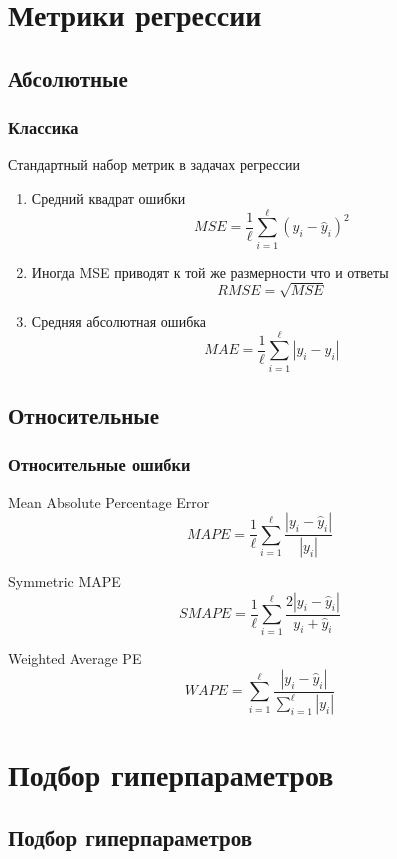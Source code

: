 \documentclass{beamer}
\begin{document}
	\section{Метрики регрессии}
	
	\subsection{Абсолютные}
	
	\begin{frame}
		\frametitle{Классика}
		Стандартный набор метрик в задачах регрессии
		
		\vspace{15pt}
		\begin{enumerate}
			\item 
			Средний квадрат ошибки
			\[
			MSE = \frac{1}{\ell}\sum_{i=1}^{\ell} (y_i - \hat{y}_i)^2
			\]
			\item
			Иногда MSE приводят к той же размерности что и ответы
			\[
			RMSE = \sqrt{MSE}
			\]
			\item 
			Средняя абсолютная ошибка
			\[
			MAE = \frac{1}{\ell}\sum_{i=1}^{\ell} |y_i - \hat{y}_i|
			\]
		\end{enumerate}
	\end{frame}
	
	\subsection{Относительные}
	
	\begin{frame}
		\frametitle{Относительные ошибки}
		
		Mean Absolute Percentage Error
		\[
		MAPE = \frac{1}{\ell} \sum_{i=1}^{\ell} \frac{|y_i - \hat{y}_i|}{|y_i|}
		\]
		
		Symmetric MAPE
		\[
		SMAPE = \frac{1}{\ell} \sum_{i=1}^{\ell} \frac{2 |y_i - \hat{y}_i|}{y_i + \hat{y}_i}
		\]
		
		Weighted Average PE
		\[
		WAPE = \sum_{i=1}^{\ell} \frac{|y_i - \hat{y}_i|}{\sum_{i=1}^{\ell} |y_i|}
		\]
	\end{frame}

	\section{Подбор гиперпараметров}
	
	\subsection{Подбор гиперпараметров}
	
\end{document}
